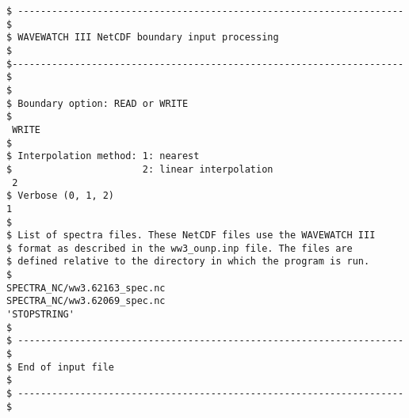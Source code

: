 \begin{footnotesize}
\begin{verbatim}
$ -------------------------------------------------------------------- $
$ WAVEWATCH III NetCDF boundary input processing                       $
$--------------------------------------------------------------------- $
$
$ Boundary option: READ or WRITE
$
 WRITE 
$
$ Interpolation method: 1: nearest
$                       2: linear interpolation
 2 
$ Verbose (0, 1, 2)
1
$
$ List of spectra files. These NetCDF files use the WAVEWATCH III
$ format as described in the ww3_ounp.inp file. The files are 
$ defined relative to the directory in which the program is run.
$
SPECTRA_NC/ww3.62163_spec.nc
SPECTRA_NC/ww3.62069_spec.nc
'STOPSTRING'
$
$ -------------------------------------------------------------------- $
$ End of input file                                                    $
$ -------------------------------------------------------------------- $
\end{verbatim}
\end{footnotesize}
